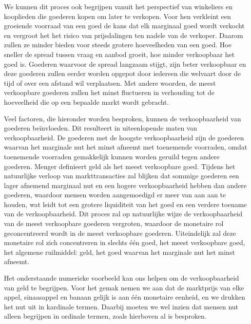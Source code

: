 We kunnen dit proces ook begrijpen vanuit het perspectief van winkeliers en kooplieden die goederen kopen om later te verkopen. Voor hen verkleint een groeiende voorraad van een goed de kans dat elk marginaal goed wordt verkocht en vergroot het het risico van prijsdalingen ten nadele van de verkoper. Daarom zullen ze minder bieden voor steeds grotere hoeveelheden van een goed. Hoe sneller de spread tussen vraag en aanbod groeit, hoe minder verkoopbaar het goed is. Goederen waarvoor de spread langzaam stijgt, zijn beter verkoopbaar en deze goederen zullen eerder worden opgepot door iedereen die welvaart door de tijd of over een afstand wil verplaatsen. Met andere woorden, de meest verkoopbare goederen zullen het minst fluctueren in verhouding tot de hoeveelheid die op een bepaalde markt wordt gebracht.

Veel factoren, die hieronder worden besproken, kunnen de verkoopbaarheid van goederen beïnvloeden. Dit resulteert in uiteenlopende maten van verkoopbaarheid. De goederen met de hoogste verkoopbaarheid zijn de goederen waarvan het marginale nut het minst afneemt met toenemende voorraden, omdat toenemende voorraden gemakkelijk kunnen worden geruild tegen andere goederen. Menger definieert geld als het meest verkoopbare goed. Tijdens het natuurlijke verloop van markttransacties zal blijken dat sommige goederen een lager afnemend marginaal nut en een hogere verkoopbaarheid hebben dan andere goederen, waardoor mensen worden aangemoedigd er meer van aan aan te houden, wat leidt tot een grotere liquiditeit van het goed en een verdere toename van de verkoopbaarheid. Dit proces zal op natuurlijke wijze de verkoopbaarheid van de meest verkoopbare goederen vergroten, waardoor de monetaire rol geconcentreerd wordt in de meest verkoopbare goederen. Uiteindelijk zal deze monetaire rol zich concentreren in slechts één goed, het meest verkoopbare goed, het algemene ruilmiddel: geld, het goed waarvan het marginale nut het minst afneemt.

Het onderstaande numerieke voorbeeld kan ons helpen om de verkoopbaarheid van geld te begrijpen. Voor het gemak nemen we aan dat de marktprijs van elke appel, sinaasappel en banaan gelijk is aan één monetaire eenheid, en we drukken het nut uit in kardinale termen. Daarbij moeten we wel inzien dat mensen nut alleen begrijpen in ordinale termen, zoals hierboven al is besproken.

